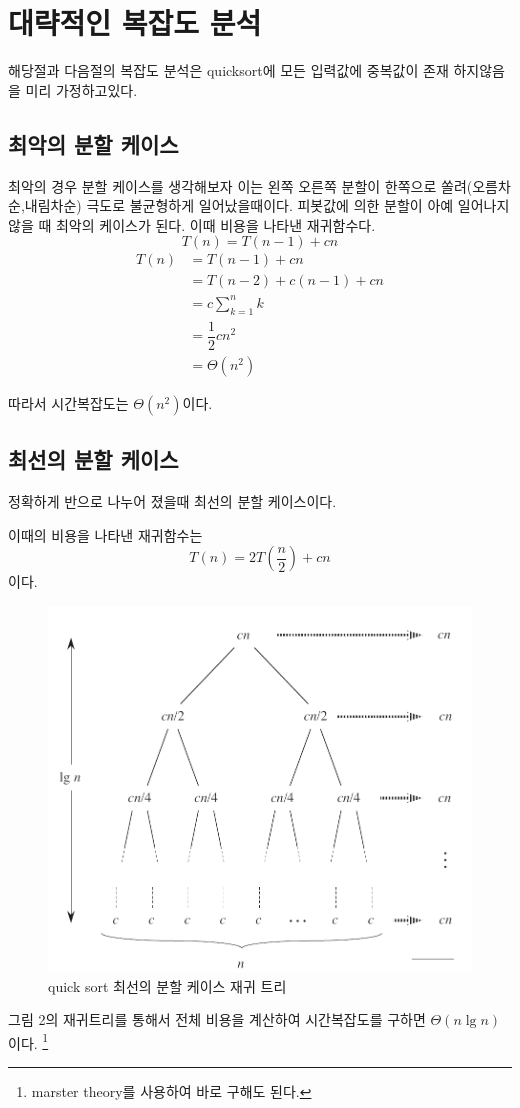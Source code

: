 
\section{대략적인 복잡도 분석}


해당절과 다음절의 복잡도 분석은 quicksort에 모든 입력값에 중복값이 존재 하지않음을 미리 가정하고있다.

\subsection{최악의 분할 케이스} 

최악의 경우 분할 케이스를 생각해보자 
이는 왼쪽 오른쪽 분할이 한쪽으로 쏠려(오름차순,내림차순) 극도로 불균형하게 일어났을때이다.
피봇값에 의한 분할이 아예 일어나지 않을 때 최악의 케이스가 된다.
이때 비용을 나타낸 재귀함수다.
$$T(n) = T(n-1) + cn $$
\begin{align*}
    T(n) &= T(n-1) + cn \\
    &= T(n-2) + c(n-1) +cn \\
    &= c\sum^{n}_{k=1}k \\
    &= \dfrac{1}{2} cn^{2}\\
    &= \Theta (n^{2})    
\end{align*}


따라서 시간복잡도는 $\Theta(n^2)$이다.

\subsection{최선의 분할 케이스} 

정확하게 반으로 나누어 졌을때 최선의 분할 케이스이다.

이때의 비용을 나타낸 재귀함수는
$$T(n) = 2T(\dfrac{n}{2}) + cn$$
이다.

\begin{figure}[h!]
    \centering
    \includegraphics[scale=0.5]{pic/q2.png}
    \caption{quick sort 최선의 분할 케이스 재귀 트리\cite{reference1}}
\end{figure}
그림 2의 재귀트리를 통해서 전체 비용을 계산하여 시간복잡도를 구하면 $\Theta(n \lg n)$이다. \footnote{marster theory를 사용하여 바로 구해도 된다.}

